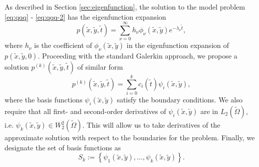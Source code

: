 As described in Section \ref{sec:eigenfunction}, the solution to the
model problem \eqref{eq:qqq} - \eqref{eq:qqq-2} has the eigenfunction
expansion
\[
  p(\tilde{x},\tilde{y},\tilde{t}) = \sum_{\nu=0}^\infty h_\nu
  \phi_\nu(\tilde{x},\tilde{y}) e^{-\lambda_\nu \tilde{t}},
\]
where $h_\nu$ is the coefficient of $\phi_\nu(\tilde{x},\tilde{y})$ in the
eigenfunction expansion of $p(\tilde{x},\tilde{y},0)$. Proceeding with the standard
Galerkin approach, we propose a solution $p^{(k)}(\tilde{x},\tilde{y},\tilde{t})$ of similar
form
\[
  p^{(k)}(\tilde{x},\tilde{y},\tilde{t}) = \sum_{i=0}^k c_i(\tilde{t})
  \psi_i(\tilde{x},\tilde{y}),
\]
where the basis functions $\psi_i(\tilde{x},\tilde{y})$ satisfy the
boundary conditions. We also require that all first- and second-order
derivatives of $\psi_i(\tilde{x},\tilde{y})$ are in
$L_2(\tilde{\Omega})$, i.e.
$\psi_k(\tilde{x},\tilde{y}) \in W_{2}^{2}(\tilde{\Omega})$. This will
allow us to take derivatives of the approximate solution with respect
to the boundaries for the problem. Finally, we designate the set of
basis functions as
\[
  S_k := \left\{ \psi_1(\tilde{x},\tilde{y}), \ldots, \psi_k(\tilde{x},\tilde{y}) \right\}.
\]

